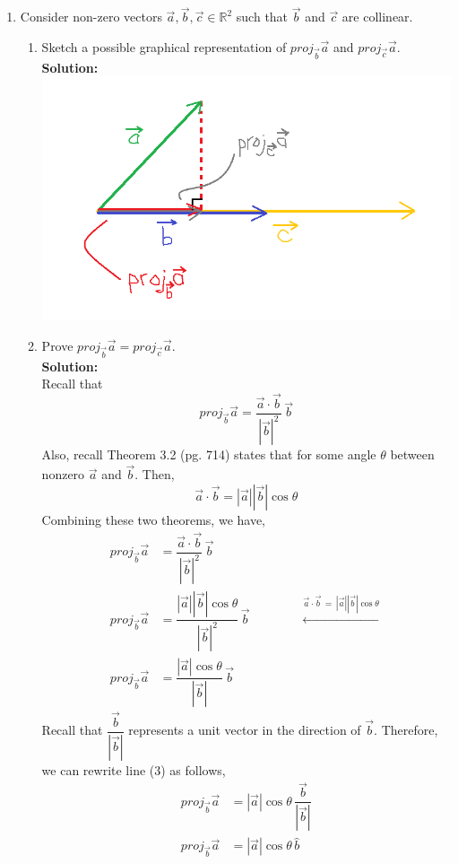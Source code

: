 \documentclass[12pt]{book}
\begin{document}
\begin{enumerate}
\newpage

\item Consider non-zero vectors $\vec{a}, \vec{b}, \vec{c} \in \mathbb{R}^2$ such that $\vec{b}$ and $\vec{c}$ are collinear.
\begin{enumerate}
\item Sketch a possible graphical representation of $proj_{\vec{b}}\vec{a}$ and $proj_{\vec{c}}\vec{a}$.\\

\textbf{Solution:}\\
\includegraphics[scale=0.8]{Q5aImage(1).png}


\item Prove $proj_{\vec{b}}\vec{a} = proj_{\vec{c}}\vec{a}$.\\

\textbf{Solution:}\\
Recall that $$proj_{\vec{b}}\vec{a} = \dfrac{\vec{a} \cdot \vec{b}}{|\vec{b}|^2} \, \vec{b}$$
Also, recall Theorem 3.2 (pg. 714) states that for some angle $\theta$ between nonzero $\vec{a}$ and $\vec{b}$. Then,
$$\vec{a} \cdot \vec{b} = |\vec{a}||\vec{b}|\cos\theta$$
Combining these two theorems, we have,
\setcounter{equation}{0}
\begingroup
\addtolength{\jot}{0.5em}
\begin{align}
    proj_{\vec{b}}\vec{a} &= \dfrac{\vec{a} \cdot \vec{b}}{|\vec{b}|^2} \, \vec{b} \\
    proj_{\vec{b}}\vec{a} &= \dfrac{|\vec{a}||\vec{b}|\cos\theta}{|\vec{b}|^2} \, \vec{b} \qquad \qquad \xleftarrow[]{\vec{a} \cdot \vec{b} \,=\, |\vec{a}||\vec{b}|\cos\theta}\\
    proj_{\vec{b}}\vec{a} &= \dfrac{|\vec{a}|\cos\theta}{|\vec{b}|} \, \vec{b}
\end{align}
\endgroup
Recall that $\dfrac{\vec{b}}{|\vec{b}|}$ represents a unit vector in the direction of $\vec{b}$. Therefore, we can rewrite line (3) as follows,
\begingroup
\addtolength{\jot}{0.5em}
\begin{align}
    proj_{\vec{b}}\vec{a} &= |\vec{a}|\cos\theta \, \dfrac{\vec{b}}{|\vec{b}|} \\
    proj_{\vec{b}}\vec{a} &= |\vec{a}| \cos\theta \, \hat{b}
\end{align}
\endgroup


\end{enumerate}
\end{enumerate}
\end{document}
